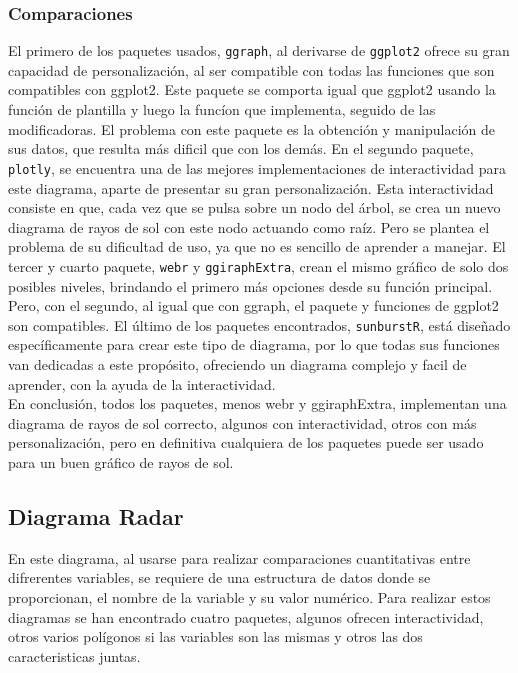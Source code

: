 \documentclass{article}\usepackage[]{graphicx}\usepackage[]{color}
\begin{document}
\subsubsection{Comparaciones}
El primero de los paquetes usados, \texttt{ggraph}, al derivarse de \texttt{ggplot2} ofrece su gran capacidad de personalizaci\'on, al ser compatible con todas las funciones que son compatibles con ggplot2. Este paquete se comporta igual que ggplot2 usando la funci\'on de plantilla y luego la func\'ion que implementa, seguido de las modificadoras. El problema con este paquete es la obtenci\'on y manipulaci\'on de sus datos, que resulta m\'as dificil que con los dem\'as.
En el segundo paquete, \texttt{plotly}, se encuentra una de las mejores implementaciones de interactividad para este diagrama, aparte de presentar su gran personalizaci\'on. Esta interactividad consiste en que, cada vez que se pulsa sobre un nodo del \'arbol, se crea un nuevo diagrama de rayos de sol con este nodo actuando como ra\'iz. Pero se plantea el problema de su dificultad de uso, ya que no es sencillo de aprender a manejar.
El tercer y cuarto paquete, \texttt{webr} y \texttt{ggiraphExtra}, crean el mismo gr\'afico de solo dos posibles niveles, brindando el primero m\'as opciones desde su funci\'on principal. Pero, con el segundo, al igual que con ggraph, el paquete y funciones de ggplot2 son compatibles.
El \'ultimo de los paquetes encontrados, \texttt{sunburstR}, est\'a dise\~nado espec\'ificamente para crear este tipo de diagrama, por lo que todas sus funciones van dedicadas a este prop\'osito, ofreciendo un diagrama complejo y facil de aprender, con la ayuda de la interactividad.~\\
En conclusi\'on, todos los paquetes, menos webr y ggiraphExtra, implementan una diagrama de rayos de sol correcto, algunos con interactividad, otros con m\'as personalizaci\'on, pero en definitiva cualquiera de los paquetes puede ser usado para un buen gr\'afico de rayos de sol.
\clearpage
\subsection{Diagrama Radar}\label{ssec:radar}
En este diagrama, al usarse para realizar comparaciones cuantitativas entre difrerentes variables, se requiere de una estructura de datos donde se proporcionan, el nombre de la variable y su valor num\'erico. 
Para realizar estos diagramas se han encontrado cuatro paquetes, algunos ofrecen interactividad, otros varios pol\'igonos si las variables son las mismas y otros las dos caracteristicas juntas.
\end{document}
